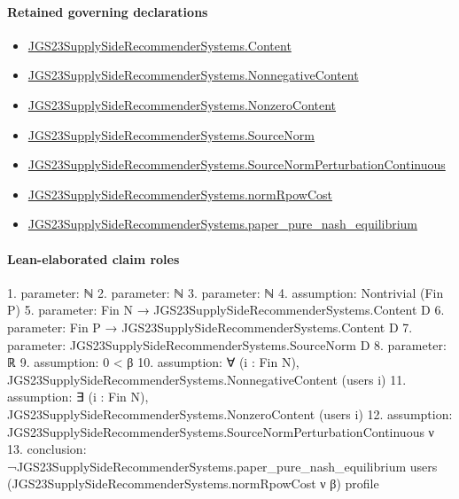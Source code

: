 \documentclass[10pt]{article}
\begin{document}
\paragraph{Retained governing declarations}
\begin{itemize}\raggedright
\item \hyperlink{governing-declaration-367305fda50f0ada}{JGS23\allowbreak{}Supply\allowbreak{}Side\allowbreak{}Recommender\allowbreak{}Systems.\allowbreak{}Content}
\item \hyperlink{governing-declaration-d426babe40b9593c}{JGS23\allowbreak{}Supply\allowbreak{}Side\allowbreak{}Recommender\allowbreak{}Systems.\allowbreak{}Nonnegative\allowbreak{}Content}
\item \hyperlink{governing-declaration-90e2ac7d13788c50}{JGS23\allowbreak{}Supply\allowbreak{}Side\allowbreak{}Recommender\allowbreak{}Systems.\allowbreak{}Nonzero\allowbreak{}Content}
\item \hyperlink{governing-declaration-6141339a5d3412d9}{JGS23\allowbreak{}Supply\allowbreak{}Side\allowbreak{}Recommender\allowbreak{}Systems.\allowbreak{}Source\allowbreak{}Norm}
\item \hyperlink{governing-declaration-6ccc463be39b315f}{JGS23\allowbreak{}Supply\allowbreak{}Side\allowbreak{}Recommender\allowbreak{}Systems.\allowbreak{}Source\allowbreak{}Norm\allowbreak{}Perturbation\allowbreak{}Continuous}
\item \hyperlink{governing-declaration-54533813c77cea72}{JGS23\allowbreak{}Supply\allowbreak{}Side\allowbreak{}Recommender\allowbreak{}Systems.\allowbreak{}norm\allowbreak{}Rpow\allowbreak{}Cost}
\item \hyperlink{governing-declaration-0a4475fba2928df1}{JGS23\allowbreak{}Supply\allowbreak{}Side\allowbreak{}Recommender\allowbreak{}Systems.\allowbreak{}paper\_\allowbreak{}pure\_\allowbreak{}nash\_\allowbreak{}equilibrium}
\end{itemize}
\paragraph{Lean-elaborated claim roles}\begin{ReviewVerbatim}
1. parameter: ℕ
2. parameter: ℕ
3. parameter: ℕ
4. assumption: Nontrivial (Fin P)
5. parameter: Fin N → JGS23SupplySideRecommenderSystems.Content D
6. parameter: Fin P → JGS23SupplySideRecommenderSystems.Content D
7. parameter: JGS23SupplySideRecommenderSystems.SourceNorm D
8. parameter: ℝ
9. assumption: 0 < β
10. assumption: ∀ (i : Fin N), JGS23SupplySideRecommenderSystems.NonnegativeContent (users i)
11. assumption: ∃ (i : Fin N), JGS23SupplySideRecommenderSystems.NonzeroContent (users i)
12. assumption: JGS23SupplySideRecommenderSystems.SourceNormPerturbationContinuous ν
13. conclusion: ¬JGS23SupplySideRecommenderSystems.paper_pure_nash_equilibrium users
    (JGS23SupplySideRecommenderSystems.normRpowCost ν β) profile
\end{ReviewVerbatim}
\end{document}
